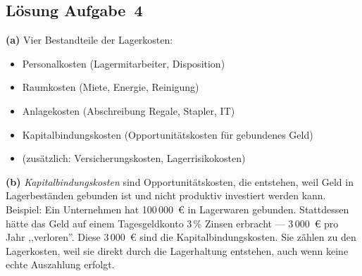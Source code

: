 \documentclass[11pt, a4paper]{article}
\begin{document}
\subsection*{Lösung Aufgabe~4}
\begin{loesung}
\textbf{(a)} Vier Bestandteile der Lagerkosten:
\begin{itemize}[itemsep=0pt]
  \item Personalkosten (Lagermitarbeiter, Disposition)
  \item Raumkosten (Miete, Energie, Reinigung)
  \item Anlagekosten (Abschreibung Regale, Stapler, IT)
  \item Kapitalbindungskosten (Opportunitätskosten für gebundenes Geld)
  \item (zusätzlich: Versicherungskosten, Lagerrisikokosten)
\end{itemize}

\textbf{(b)} \emph{Kapitalbindungskosten} sind Opportunitätskosten, die entstehen, weil
Geld in Lagerbeständen gebunden ist und nicht produktiv investiert werden kann. Beispiel:
Ein Unternehmen hat 100\,000~€ in Lagerwaren gebunden. Stattdessen hätte das Geld auf
einem Tagesgeldkonto 3\,\% Zinsen erbracht --- 3\,000~€ pro Jahr ,,verloren''. Diese
3\,000~€ sind die Kapitalbindungskosten. Sie zählen zu den Lagerkosten, weil sie direkt
durch die Lagerhaltung entstehen, auch wenn keine echte Auszahlung erfolgt.
\end{loesung}
\end{document}
